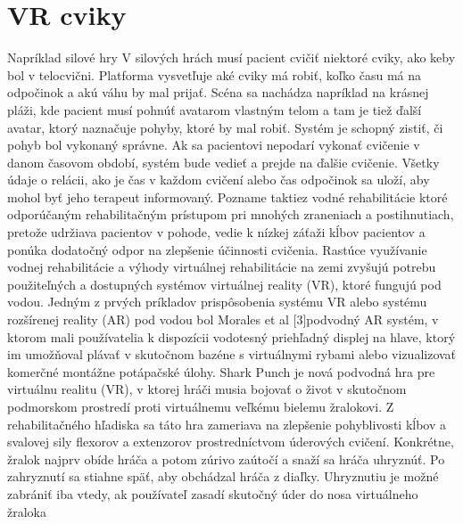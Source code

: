 \documentclass[10pt,oneside,slovak,a4paper]{article}
\begin{document}
\section{VR cviky} \label{VR rehabilitácie}
Napríklad
silové hry
V silových hrách musí pacient cvičiť niektoré cviky, ako keby bol v telocvični. Platforma vysvetľuje
aké cviky má robiť, koľko času má na odpočinok a akú váhu by mal prijať.
Scéna sa nachádza napríklad na krásnej pláži, kde pacient musí pohnúť avatarom vlastným telom a tam je
tiež ďalší avatar, ktorý naznačuje pohyby, ktoré by mal robiť.
Systém je schopný zistiť, či 
pohyb bol vykonaný správne. Ak sa pacientovi nepodarí vykonať cvičenie v danom časovom období,
systém bude vedieť a prejde na ďalšie cvičenie. Všetky údaje o relácii, ako je čas v každom cvičení alebo čas
odpočinok sa uloží, aby mohol byť jeho terapeut informovaný.
Pozname taktiez vodné rehabilitácie ktoré odporúčaným rehabilitačným prístupom pri mnohých zraneniach a postihnutiach, pretože udržiava pacientov v pohode, vedie k nízkej záťaži kĺbov pacientov a ponúka dodatočný odpor na zlepšenie účinnosti cvičenia. Rastúce využívanie vodnej rehabilitácie a výhody virtuálnej rehabilitácie na zemi zvyšujú potrebu použiteľných a dostupných systémov virtuálnej reality (VR), ktoré fungujú pod vodou. Jedným z prvých príkladov prispôsobenia systému VR alebo systému rozšírenej reality (AR) pod vodou bol Morales et al [3]podvodný AR systém, v ktorom mali používatelia k dispozícii vodotesný priehľadný displej na hlave, ktorý im umožňoval plávať v skutočnom bazéne s virtuálnymi rybami alebo vizualizovať komerčné montážne potápačské úlohy.
Shark Punch je nová podvodná hra pre virtuálnu realitu (VR), v ktorej hráči musia bojovať o život v skutočnom podmorskom prostredí proti virtuálnemu veľkému bielemu žralokovi. Z rehabilitačného hľadiska sa táto hra zameriava na zlepšenie pohyblivosti kĺbov a svalovej sily flexorov a extenzorov prostredníctvom úderových cvičení. Konkrétne, žralok najprv obíde hráča a potom zúrivo zaútočí a snaží sa hráča uhryznúť. Po zahryznutí sa stiahne späť, aby obchádzal hráča z diaľky. Uhryznutiu je možné zabrániť iba vtedy, ak používateľ zasadí skutočný úder do nosa virtuálneho žraloka 

\cite{PEDRAZAHUESO2015161}
\cite{doi:10.1089/109493103322011641}

\end{document}
